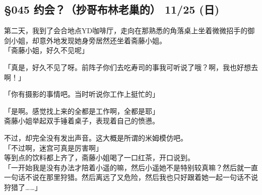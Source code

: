 \subsection{§045 约会？（抄哥布林老巢的） 11/25 (日)}

第二天，我到了会合地点YD咖啡厅，走向在那熟悉的角落桌上坐着微微招手的御剑小姐，却意外地发现她身旁居然还坐着斋藤小姐。\\

「斋藤小姐，好久不见呢」

「真是，好久不见了呀。前阵子你们去吃寿司的事我可听说了哦？啊，我也好想去啊！」

「你有摄影的事情吧。当时听说你工作上挺忙的」

「是啊。感觉找上来的全都是工作啊，全都是耶」\\

斋藤小姐举起双手锤着桌子，表现着自己的愤懑。

不过，却完全没有发出声音。这大概是所谓的米姆模仿吧。\\

「不过啊，迷宫可真是厉害啊」\\

等到点的饮料都上齐了，斋藤小姐喝了一口红茶，开口说到。\\

「一开始我是没有办法才陪着小遥的嘛，然后小遥她不是特别较真嘛？然后就一直一句话不说在那里狩猎。然后离远了又危险，然后我也只好跟着她一起一句话不说狩猎了……」\\

